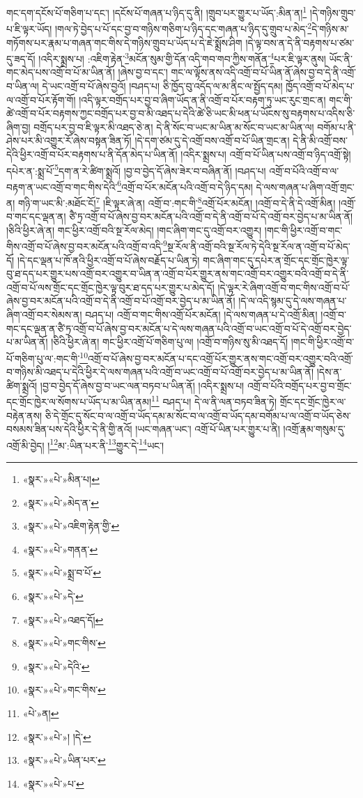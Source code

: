 གང་དག་དངོས་པོ་གཅིག་པ་དང་། །དངོས་པོ་གཞན་པ་ཉིད་དུ་ནི། །གྲུབ་པར་གྱུར་པ་ཡོད་:མིན་ན།\footnote{«སྣར་»«པེ་»མིན་པ།} །དེ་གཉིས་གྲུབ་པ་ཇི་ལྟར་ཡོད། །གལ་ཏེ་བྱེད་པ་པོ་དང་བྱ་བ་གཉིས་གཅིག་པ་ཉིད་དང་གཞན་པ་ཉིད་དུ་གྲུབ་པ་མེད་\footnote{«སྣར་»«པེ་»མེད་ན་}དེ་གཉིས་མ་གཏོགས་པར་རྣམ་པ་གཞན་གང་གིས་དེ་གཉིས་གྲུབ་པ་ཡོད་པ་དེ་ཇེ་སྨྲོས་ཤིག །དེ་ལྟ་བས་ན་དེ་ནི་བརྟགས་པ་ཙམ་དུ་ཟད་དོ། །འདིར་སྨྲས་པ། :འཇིག་རྟེན་\footnote{«སྣར་»«པེ་»འཇིག་རྟེན་གྱི་}མངོན་སུམ་གྱི་དོན་འདི་གབ་གབ་ཀྱིས་གནོན་\footnote{«སྣར་»«པེ་»གནན་}པར་ཇི་ལྟར་ནུས། ཡོང་ནི་གང་མེད་པས་འགྲོ་བ་པོ་མ་ཡིན་ནོ། །ཞེས་བྱ་བ་དང་། གང་ལ་ལྟོས་ནས་འདི་འགྲོ་བ་པོ་ཡིན་ནོ་ཞེས་བྱ་བ་དེ་ནི་འགྲོ་བ་ཡིན་ལ། དེ་ཡང་འགྲོ་བ་པོ་ཞེས་བྱའོ། །བཤད་པ། ཅི་ཁྱོད་བུ་འདོད་ལ་མ་ནིང་ལ་སྤྱོད་དམ། ཁྱོད་འགྲོ་བ་པོ་མེད་པ་ལ་འགྲོ་བ་པོར་རྟོག་གོ། །འདི་ལྟར་བགྲོད་པར་བྱ་བ་ཞིག་ཡོད་ན་ནི་འགྲོ་བ་པོར་བརྟག་ཏུ་ཡང་རུང་གྲང་ན། གང་གི་ཚེ་འགྲོ་བ་པོར་བརྟགས་ཀྱང་བགྲོད་པར་བྱ་བ་མི་འཐད་པ་དེའི་ཚེ་ཅི་ཡང་མི་ཕན་པ་ཡོངས་སུ་བརྟགས་པ་འདིས་ཅི་ཞིག་བྱ། བགྲོད་པར་བྱ་བ་ཇི་ལྟར་མི་འཐད་ཅེ་ན། དེ་ནི་སོང་བ་ཡང་མ་ཡིན་མ་སོང་བ་ཡང་མ་ཡིན་ལ། བགོམ་པ་ནི་ཤེས་པར་མི་འགྱུར་རོ་ཞེས་བསྟན་ཟིན་ཏོ། །དེ་དག་ཙམ་དུ་དེ་འགྲོ་བས་འགྲོ་བ་པོ་ཡིན་གྲང་ན། དེ་ནི་མི་འགྲོ་བས་དེའི་ཕྱིར་འགྲོ་བ་པོར་བརྟགས་པ་ནི་དོན་མེད་པ་ཡིན་ནོ། །འདིར་སྨྲས་པ། འགྲོ་བ་པོ་ཡིན་པས་འགྲོ་བ་ཉིད་འགྲོ་སྟེ། དཔེར་ན་:སྨྲ་པོ་\footnote{«སྣར་»«པེ་»སྨྲ་བ་པོ་}དག་ན་རེ་ཚིག་སྨྲའོ། །བྱ་བ་བྱེད་དོ་ཞེས་ཟེར་བ་བཞིན་ནོ། །བཤད་པ། འགྲོ་བ་པོའི་འགྲོ་བ་ལ་བརྟག་ན་ཡང་འགྲོ་བ་གང་གིས་དེའི་\footnote{«སྣར་»«པེ་»དེ་}འགྲོ་བ་པོར་མངོན་པའི་འགྲོ་བ་དེ་ཉིད་དམ། དེ་ལས་གཞན་པ་ཞིག་འགྲོ་གྲང་ན། གཉི་ག་ཡང་མི་:མཐོང་ངོ།\footnote{«སྣར་»«པེ་»འཐད་དོ།} །ཇི་ལྟར་ཞེ་ན། འགྲོ་བ་:གང་གི་\footnote{«སྣར་»«པེ་»གང་གིས་}འགྲོ་པོར་མངོན། །འགྲོ་བ་དེ་ནི་དེ་འགྲོ་མིན། །འགྲོ་བ་གང་དང་ལྡན་ན། ཙཻ་ཏྲ་འགྲོ་བ་པོ་ཞེས་བྱ་བར་མངོན་པའི་འགྲོ་བ་དེ་ནི་འགྲོ་བ་པོ་དེ་འགྲོ་བར་བྱེད་པ་མ་ཡིན་ནོ། །ཅིའི་ཕྱིར་ཞེ་ན། གང་ཕྱིར་འགྲོ་བའི་སྔ་རོལ་མེད། །གང་ཞིག་གང་དུ་འགྲོ་བར་འགྱུར། །གང་གི་ཕྱིར་འགྲོ་བ་གང་གིས་འགྲོ་བ་པོ་ཞེས་བྱ་བར་མངོན་པའི་འགྲོ་བ་འདི་\footnote{«སྣར་»«པེ་»དེའི་}སྔ་རོལ་ནི་འགྲོ་བའི་སྔ་རོལ་ཏེ་དེའི་སྔ་རོལ་ན་འགྲོ་བ་པོ་མེད་དོ། །དེ་དང་ལྡན་པ་ཁོ་ནའི་ཕྱིར་འགྲོ་བ་པོ་ཞེས་བརྗོད་པ་ཡིན་ཏེ། གང་ཞིག་གང་དུ་དཔེར་ན་གྲོང་དང་གྲོང་ཁྱེར་ལྟ་བུ་ཐ་དད་པར་གྱུར་པས་འགྲོ་བར་འགྱུར་བ་ཡིན་ན་འགྲོ་བ་པོར་གྱུར་ནས་གང་འགྲོ་བར་འགྱུར་བའི་འགྲོ་བ་དེ་ནི་འགྲོ་བ་པོ་ལས་གྲོང་དང་གྲོང་ཁྱེར་ལྟ་བུར་ཐ་དད་པར་གྱུར་པ་མེད་དོ། །དེ་ལྟར་རེ་ཞིག་འགྲོ་བ་གང་གིས་འགྲོ་བ་པོ་ཞེས་བྱ་བར་མངོན་པའི་འགྲོ་བ་དེ་ནི་འགྲོ་བ་པོ་འགྲོ་བར་བྱེད་པ་མ་ཡིན་ནོ། །དེ་ལ་འདི་སྙམ་དུ་དེ་ལས་གཞན་པ་ཞིག་འགྲོ་བར་སེམས་ན། བཤད་པ། འགྲོ་བ་གང་གིས་འགྲོ་པོར་མངོན། །དེ་ལས་གཞན་པ་དེ་འགྲོ་མིན། །འགྲོ་བ་གང་དང་ལྡན་ན་ཙཻ་ཏྲ་འགྲོ་བ་པོ་ཞེས་བྱ་བར་མངོན་པ་དེ་ལས་གཞན་པའི་འགྲོ་བ་ཡང་འགྲོ་བ་པོ་དེ་འགྲོ་བར་བྱེད་པ་མ་ཡིན་ནོ། །ཅིའི་ཕྱིར་ཞེ་ན། གང་ཕྱིར་འགྲོ་པོ་གཅིག་པུ་ལ། །འགྲོ་བ་གཉིས་སུ་མི་འཐད་དོ། །གང་གི་ཕྱིར་འགྲོ་བ་པོ་གཅིག་པུ་ལ་:གང་གི་\footnote{«སྣར་»«པེ་»གང་གིས་}འགྲོ་བ་པོ་ཞེས་བྱ་བར་མངོན་པ་དང་འགྲོ་པོར་གྱུར་ནས་གང་འགྲོ་བར་འགྱུར་བའི་འགྲོ་བ་གཉིས་མི་འཐད་པ་དེའི་ཕྱིར་དེ་ལས་གཞན་པའི་འགྲོ་བ་ཡང་འགྲོ་བ་པོ་འགྲོ་བར་བྱེད་པ་མ་ཡིན་ནོ། །དེས་ན་ཚིག་སྨྲའོ། །བྱ་བ་བྱེད་དོ་ཞེས་བྱ་བ་ཡང་ལན་བཏབ་པ་ཡིན་ནོ། །འདིར་སྨྲས་པ། འགྲོ་བ་པོའི་བགྲོད་པར་བྱ་བ་གྲོང་དང་གྲོང་ཁྱེར་ལ་སོགས་པ་ཡོད་པ་མ་ཡིན་ནམ།\footnote{«པེ་»ན།} བཤད་པ། དེ་ལ་ནི་ལན་བཏབ་ཟིན་ཏེ། གྲོང་དང་གྲོང་ཁྱེར་ལ་བརྟེན་ནས། ཅི་དེ་གྲོང་དུ་སོང་བ་ལ་འགྲོ་བ་ཡོད་དམ་མ་སོང་བ་ལ་འགྲོ་བ་ཡོད་དམ་བགོམ་པ་ལ་འགྲོ་བ་ཡོད་ཅེས་བསམས་ཟིན་པས་དེའི་ཕྱིར་དེ་ནི་གྱི་ནའོ། །ཡང་གཞན་ཡང་། འགྲོ་པོ་ཡིན་པར་གྱུར་པ་ནི། །འགྲོ་རྣམ་གསུམ་དུ་འགྲོ་མི་བྱེད། །\footnote{«སྣར་»«པེ་»། །དེ་}མ་:ཡིན་པར་ནི་\footnote{«སྣར་»«པེ་»ཡིན་པར་}གྱུར་དེ་\footnote{«སྣར་»«པེ་»པ་}ཡང་། 